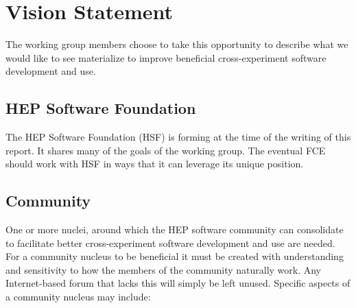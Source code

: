 \section{Vision Statement}

The working group members choose to take this opportunity to describe
what we would like to see materialize to improve beneficial
cross-experiment software development and use.

\subsection{HEP Software Foundation}

The HEP Software Foundation\cite{hsfwhitepaper} (HSF) is forming at
the time of the writing of this report.  It shares many of the goals
of the working group.  The eventual FCE should work with HSF in ways
that it can leverage its unique position.  

\subsection{Community}

One or more nuclei, around which the HEP software community can
consolidate to facilitate better cross-experiment software development
and use are needed.  For a community nucleus to be beneficial it must be created
with understanding and sensitivity to how the members of the community
naturally work.  Any Internet-based forum that lacks this will simply
be left unused.  Specific aspects of a community nucleus may include:

